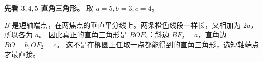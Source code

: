 \begin{explanationbox}
\textbf{先看 $3,4,5$ 直角三角形。} 取 $a=5,b=3,c=4$。

$B$ 是短轴端点，在两焦点的垂直平分线上。两条橙色线段一样长，又相加为 $2a$，所以各为 $a$。
因此真正的直角三角形是 $BOF_2$：斜边 $BF_2=a$，直角边 $BO=b,OF_2=c$。
这不是在椭圆上任取一点都能得到的直角三角形，选短轴端点才最直接。
\end{explanationbox}
\clearpage
